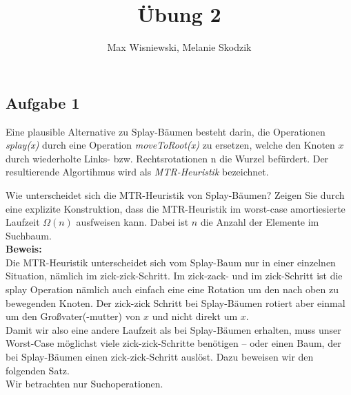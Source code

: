 \documentclass[11pt,a4paper,ngerman]{article}
\date{}
\title{Übung 2}
\author{Max Wisniewski, Melanie Skodzik}
\begin{document}

\renewcommand{\figurename}{Figure}

\maketitle
\thispagestyle{fancy}


\subsection*{Aufgabe 1}

Eine plausible Alternative zu Splay-Bäumen besteht darin, die Operationen \emph{splay(x)} durch eine Operation \emph{moveToRoot(x)} zu ersetzen, welche den Knoten $x$ durch wiederholte Links- bzw. Rechtsrotationen n die Wurzel befürdert. Der resultierende Algortihmus wird als \emph{MTR-Heuristik} bezeichnet.

Wie unterscheidet sich die MTR-Heuristik von Splay-Bäumen? Zeigen Sie durch eine explizite Konstruktion, dass die MTR-Heuristik im worst-case amortiesierte Laufzeit $\Omega(n)$ ausfweisen kann. Dabei ist $n$ die Anzahl der Elemente im Suchbaum.\\

\noindent\textbf{Beweis:}\\

Die MTR-Heuristik unterscheidet sich vom Splay-Baum nur in einer einzelnen Situation, nämlich im zick-zick-Schritt. Im zick-zack- und im zick-Schritt ist die splay Operation nämlich auch einfach eine eine Rotation um den nach oben zu bewegenden Knoten. Der zick-zick Schritt bei Splay-Bäumen rotiert aber einmal um den Großvater(-mutter) von $x$ und nicht direkt um $x$.\\

Damit wir also eine andere Laufzeit als bei Splay-Bäumen erhalten, muss unser Worst-Case möglichst viele zick-zick-Schritte benötigen -- oder einen Baum, der bei Splay-Bäumen einen zick-zick-Schritt auslöst. Dazu beweisen wir den folgenden Satz.\\

Wir betrachten nur Suchoperationen.
\end{document}
